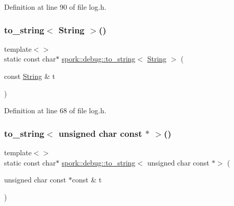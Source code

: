 Definition at line 90 of file log.\+h.

\mbox{\label{namespacespork_1_1debug_ae2c63495057b0491e5de0fc0f7f0922e}} 
\subsubsection{\texorpdfstring{to\+\_\+string$<$ String $>$()}{to\_string< String >()}}
{\footnotesize\ttfamily template$<$$>$ \\
static const char$\ast$ \hyperlink{namespacespork_1_1debug_afc2bf363eb52ab11d27418006ad8e210}{spork\+::debug\+::to\+\_\+string}$<$ \hyperlink{my_string_8h_afbeda3fd1bdc8c37d01bdf9f5c8274ff}{String} $>$ (\begin{DoxyParamCaption}\item[{const \hyperlink{my_string_8h_afbeda3fd1bdc8c37d01bdf9f5c8274ff}{String} \&}]{t }\end{DoxyParamCaption})\hspace{0.3cm}{\ttfamily [static]}}



Definition at line 68 of file log.\+h.

\mbox{\label{namespacespork_1_1debug_a2a5fd3461b42e65daf2b614c769bf849}} 
\subsubsection{\texorpdfstring{to\+\_\+string$<$ unsigned char const $\ast$ $>$()}{to\_string< unsigned char const * >()}}
{\footnotesize\ttfamily template$<$$>$ \\
static const char$\ast$ \hyperlink{namespacespork_1_1debug_afc2bf363eb52ab11d27418006ad8e210}{spork\+::debug\+::to\+\_\+string}$<$ unsigned char const $\ast$$>$ (\begin{DoxyParamCaption}\item[{unsigned char const $\ast$const \&}]{t }\end{DoxyParamCaption})\hspace{0.3cm}{\ttfamily [static]}}



